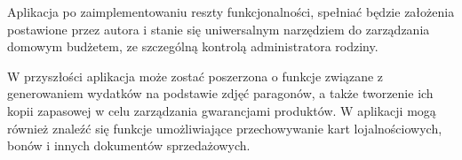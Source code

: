 Aplikacja po zaimplementowaniu reszty funkcjonalności, spełniać będzie założenia postawione przez autora i stanie się uniwersalnym narzędziem do zarządzania domowym budżetem, ze szczególną kontrolą administratora rodziny.

W przyszłości aplikacja może zostać poszerzona o funkcje związane z generowaniem wydatków na podstawie zdjęć paragonów, a także tworzenie ich kopii zapasowej w celu zarządzania gwarancjami produktów. W aplikacji mogą również znaleźć się funkcje umożliwiające przechowywanie kart lojalnościowych, bonów i innych dokumentów sprzedażowych.
